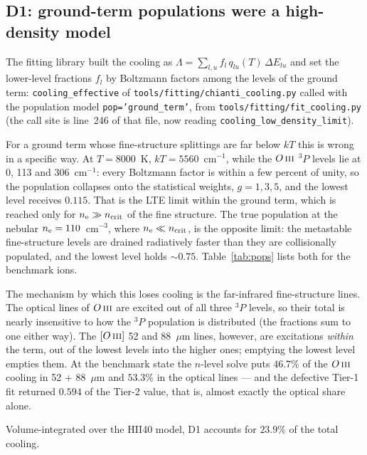 \documentclass[english,a4paper]{my_memo}
\newcommand{\code}[1]{\texttt{#1}}
\newcommand{\OIII}{O\,\textsc{iii}}
\newcommand{\nel}{n_{\rm e}}
\newcommand{\ncrit}{n_{\rm crit}}
\begin{document}
\subsection{D1: ground-term populations were a high-density model}

The fitting library built the cooling as
$\Lambda = \sum_{l,u} f_l\,q_{lu}(T)\,\Delta E_{lu}$ and set the lower-level
fractions $f_l$ by Boltzmann factors among the levels of the ground term:
\code{cooling\_effective} of
\code{tools/fitting/chianti\_cooling.py} called with the population model
\code{pop='ground\_term'}, from \code{tools/fitting/fit\_cooling.py}
(the call site is line~246 of that file, now reading
\code{cooling\_low\_density\_limit}).

For a ground term whose fine-structure splittings are far below $kT$ this is
wrong in a specific way.  At $T = 8000$~K, $kT = 5560$~cm$^{-1}$, while the
$\OIII{}$ $^3P$ levels lie at 0, 113 and 306~cm$^{-1}$: every Boltzmann factor
is within a few percent of unity, so the population collapses onto the
statistical weights, $g = 1, 3, 5$, and the lowest level receives $0.115$.
That is the LTE limit within the ground term, which is reached only for
$\nel \gg \ncrit$ of the fine structure.  The true population at the nebular
$\nel = 110$~cm$^{-3}$, where $\nel \ll \ncrit$, is the opposite limit: the
metastable fine-structure levels are drained radiatively faster than they are
collisionally populated, and the lowest level holds $\sim 0.75$.
Table~\ref{tab:pops} lists both for the benchmark ions.

The mechanism by which this loses cooling is the far-infrared fine-structure
lines.  The optical lines of $\OIII{}$ are excited out of all three $^3P$
levels, so their total is nearly insensitive to how the $^3P$ population is
distributed (the fractions sum to one either way).  The $[\OIII{}]$ 52 and
88~$\mu$m lines, however, are excitations \emph{within} the term, out of the
lowest levels into the higher ones; emptying the lowest level empties them.
At the benchmark state the $n$-level solve puts $46.7\%$ of the $\OIII{}$
cooling in 52 + 88~$\mu$m and $53.3\%$ in the optical lines --- and the
defective Tier-1 fit returned $0.594$ of the Tier-2 value, that is, almost
exactly the optical share alone.

Volume-integrated over the HII40 model, D1 accounts for $23.9\%$ of the total
cooling.
\end{document}
